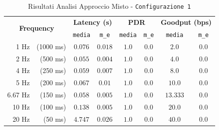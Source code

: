 \begin{table}[hbt!]
    \centering
    \begin{tabular}{ |rr|| c|c|c|c|c|c| } 
        \hline
        \multicolumn{2}{|c||}{\multirow{2}{*}{\textbf{Frequency}}} & \multicolumn{2}{|c|}{\textbf{Latency \scriptsize (s)}} & \multicolumn{2}{|c|}{\textbf{PDR}} & \multicolumn{2}{|c|}{\textbf{Goodput \scriptsize (bps)}} \\
        && \texttt{media} & \texttt{m\_e} & \texttt{media} & \texttt{m\_e} & \texttt{media} & \texttt{m\_e} \\

		\hline
		1 Hz & \scriptsize (1000 ms) & $ 0.076 $ & $ 0.018 $ & $ 1.0 $ & $ 0.0 $ & $ 2.0 $ & $ 0.0 $ \\
		\hline
		2 Hz & \scriptsize (500 ms) & $ 0.055 $ & $ 0.004 $ & $ 1.0 $ & $ 0.0 $ & $ 4.0 $ & $ 0.0 $ \\
		\hline
		4 Hz & \scriptsize (250 ms) & $ 0.059 $ & $ 0.007 $ & $ 1.0 $ & $ 0.0 $ & $ 8.0 $ & $ 0.0 $ \\
		\hline
		5 Hz & \scriptsize (200 ms) & $ 0.067 $ & $ 0.01 $ & $ 1.0 $ & $ 0.0 $ & $ 10.0 $ & $ 0.0 $ \\
		\hline
		6.67 Hz & \scriptsize (150 ms) & $ 0.058 $ & $ 0.005 $ & $ 1.0 $ & $ 0.0 $ & $ 13.333 $ & $ 0.0 $ \\
		\hline
		10 Hz & \scriptsize (100 ms) & $ 0.138 $ & $ 0.005 $ & $ 1.0 $ & $ 0.0 $ & $ 20.0 $ & $ 0.0 $ \\
		\hline
		20 Hz & \scriptsize (50 ms) & $ 4.747 $ & $ 0.026 $ & $ 1.0 $ & $ 0.0 $ & $ 40.0 $ & $ 0.0 $ \\
		\hline
    \end{tabular}
    \caption{Risultati Analisi Approccio Misto - \texttt{Configurazione 1}}
    \label{tab:table_ble_wifi_conf_1}
\end{table}

